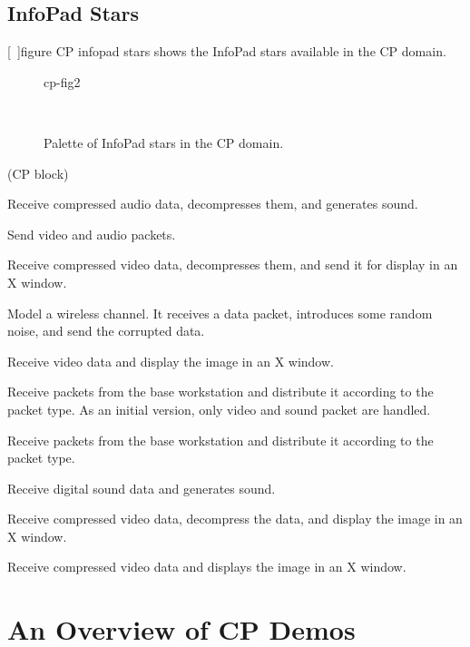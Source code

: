 \subsection{InfoPad Stars}
\label{CP InfoPad Stars}

[~\Ref]{figure CP infopad stars} shows the InfoPad
 stars available in the CP domain.

\begin{figure}
\begin{gif}{cp-fig2}
\begin{center}
\ 
\end{center}
\caption{Palette of InfoPad stars in the CP domain.}
\label{figure CP infopad stars}
\end{gif}
\end{figure}

\begin{indexlist}{ (CP block)}

Receive compressed audio data, decompresses them, 
and generates sound.

Send video and audio packets.

Receive compressed video data, decompresses
them, and send it for display in an X window.

Model a wireless channel.
It receives a data packet, introduces some random noise, 
and send the corrupted data.

Receive video data and display the image in an X window.

Receive packets from the base workstation
and distribute it according to the packet type.
As an initial version, only video and sound packet are 
handled.

Receive packets from the base workstation
and distribute it according to the packet type.

Receive digital sound data and generates sound.

Receive compressed video data, decompress the data, and
display the image in an X window.

Receive compressed video data and displays the image in an X window.

\end{indexlist}

\section{An Overview of CP Demos}
\label{CP Demo Overview}

